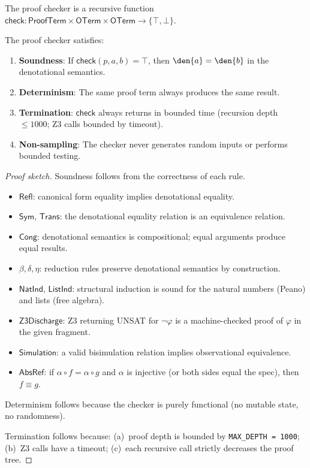 The proof checker is a recursive function
$\mathsf{check} : \mathsf{ProofTerm} \times \mathsf{OTerm} \times \mathsf{OTerm}
\to \{\top, \bot\}$.

\begin{theorem}
The proof checker satisfies:
\begin{enumerate}
\item \textbf{Soundness}: If $\mathsf{check}(p, a, b) = \top$, then
  $\den{a} = \den{b}$ in the denotational semantics.
\item \textbf{Determinism}: The same proof term always produces the
  same result.
\item \textbf{Termination}: $\mathsf{check}$ always returns in bounded
  time (recursion depth $\leq 1000$; Z3 calls bounded by timeout).
\item \textbf{Non-sampling}: The checker never generates random inputs
  or performs bounded testing.
\end{enumerate}
\end{theorem}

\begin{proof}[Proof sketch]
Soundness follows from the correctness of each rule.
\begin{itemize}
\item $\mathsf{Refl}$: canonical form equality implies denotational equality.
\item $\mathsf{Sym}$, $\mathsf{Trans}$: the denotational equality relation is
  an equivalence relation.
\item $\mathsf{Cong}$: denotational semantics is compositional; equal
  arguments produce equal results.
\item $\beta, \delta, \eta$: reduction rules preserve denotational semantics
  by construction.
\item $\mathsf{NatInd}$, $\mathsf{ListInd}$: structural induction is sound
  for the natural numbers (Peano) and lists (free algebra).
\item $\mathsf{Z3Discharge}$: Z3 returning UNSAT for $\neg\varphi$ is a
  machine-checked proof of $\varphi$ in the given fragment.
\item $\mathsf{Simulation}$: a valid bisimulation relation implies
  observational equivalence.
\item $\mathsf{AbsRef}$: if $\alpha \circ f = \alpha \circ g$ and
  $\alpha$ is injective (or both sides equal the spec), then $f \equiv g$.
\end{itemize}

Determinism follows because the checker is purely functional (no
mutable state, no randomness).

Termination follows because:
(a)~proof depth is bounded by \texttt{MAX\_DEPTH = 1000};
(b)~Z3 calls have a timeout;
(c)~each recursive call strictly decreases the proof tree.
\end{proof}



